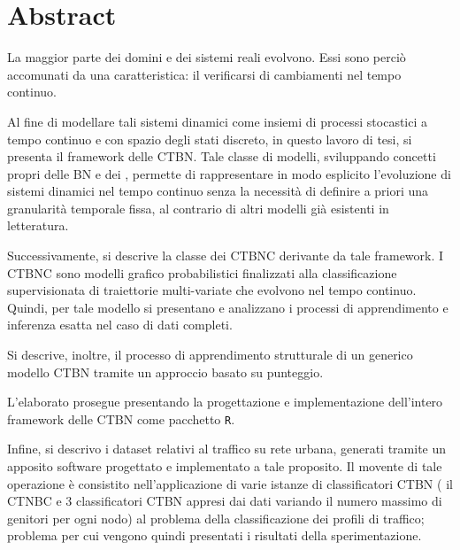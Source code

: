 
\cleardoublepage
{}
{}
\chapter*{Abstract}
La maggior parte dei domini e dei sistemi reali evolvono. Essi sono perciò accomunati da una caratteristica: il verificarsi di cambiamenti nel tempo continuo.

Al fine di modellare tali sistemi dinamici come insiemi di processi stocastici a tempo continuo e con spazio degli stati discreto, in questo lavoro di tesi, si presenta il framework delle \acf{CTBN}. Tale classe di modelli, sviluppando concetti propri delle \acf{BN} e dei \mprocess{}, permette di rappresentare in modo esplicito l'evoluzione di sistemi dinamici nel tempo continuo senza la necessità di definire a priori una granularità temporale fissa, al contrario di altri modelli già esistenti in letteratura.

Successivamente, si descrive la classe dei \acf{CTBNC} derivante da tale framework. I \acs{CTBNC} sono modelli grafico probabilistici finalizzati alla classificazione supervisionata di traiettorie multi-variate che evolvono nel tempo continuo. Quindi, per tale modello si presentano e analizzano i processi di apprendimento e inferenza esatta nel caso di dati completi.

Si descrive, inoltre, il processo di apprendimento strutturale di un generico modello \acs{CTBN} tramite un approccio basato su punteggio.

L'elaborato prosegue presentando la progettazione e implementazione dell'intero framework delle \acs{CTBN} come pacchetto \lstinline$R$.

Infine, si descrivo i dataset relativi al traffico su rete urbana, generati tramite un apposito software progettato e implementato a tale proposito. Il movente di tale operazione è consistito nell'applicazione di varie istanze di classificatori \acs{CTBN} (\ie{} il \acf{CTNBC} e $3$ classificatori \acs{CTBN} appresi dai dati variando il numero massimo di genitori per ogni nodo) al problema della classificazione dei profili di traffico; problema per cui vengono quindi presentati i risultati della sperimentazione.

\vfill

